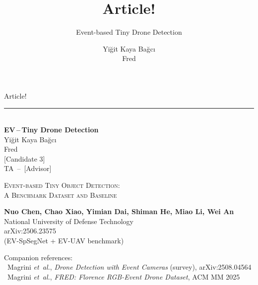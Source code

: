 \documentclass[aspectratio=169,11pt]{beamer}
\title{Article!}
\subtitle{Event-based Tiny Drone Detection}
\author{Yi\u{g}it Kaya Ba\u{g}c\i \\ Fred \\ [Candidate 3]}
\date{}
\begin{document}

\begin{frame}[plain]
  \vspace{0.6cm}
  \hspace{0.6cm}%
  \begin{minipage}{0.95\paperwidth}
    {\selectfont\fontsize{72}{80}\selectfont Article!}\\[-0.2em]
    \rule{0.94\paperwidth}{0.4pt}\\[0.2em]
    {\sffamily\bfseries\large EV\,--\,Tiny Drone Detection}\\[3.2cm]

    {\large Yi\u{g}it Kaya Ba\u{g}c\i}\\[0.2em]
    {\large Fred}\\[0.2em]
    {\large [Candidate 3]}\\[0.2em]
    {\large TA \,--\, [Advisor]}
  \end{minipage}
\end{frame}

\begin{frame}[plain]
  \vspace{1.2cm}
  \centering
  \begin{lightcard}[width=0.78\paperwidth]
    {\selectfont\Large\scshape Event-based Tiny Object Detection:\\[0.2em]
     A Benchmark Dataset and Baseline\par}
    \vspace{0.6em}
    {\small\textbf{Nuo Chen, Chao Xiao, Yimian Dai, Shiman He, Miao Li, Wei An}}\\[0.2em]
    {\small National University of Defense Technology}\\[0.4em]
    {\ttfamily\small arXiv:2506.23575}\\
    {\small (EV-SpSegNet + EV-UAV benchmark)}
  \end{lightcard}

  \vspace{0.6em}
  \begin{lightcard}[width=0.78\paperwidth]
    {\small Companion references:}\\[0.2em]
    {\small \textbullet\ Magrini \textit{et~al.}, \textit{Drone Detection with Event Cameras} (survey), arXiv:2508.04564}\\
    {\small \textbullet\ Magrini \textit{et~al.}, \textit{FRED: Florence RGB-Event Drone Dataset}, ACM MM 2025}
  \end{lightcard}

  \vspace{0.8em}
  {\large\bfseries{}}
\end{frame}
\end{document}
